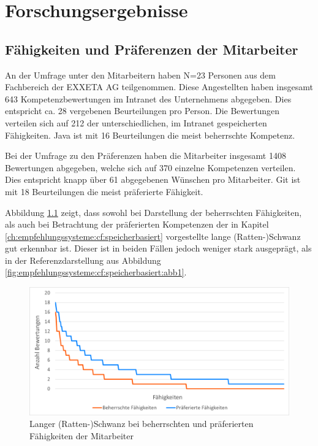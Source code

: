 \chapter{Forschungsergebnisse}
\label{ch:ergebnisse}

\section{Fähigkeiten und Präferenzen der Mitarbeiter}
\label{ch:ergebnisse:analyse}
An der Umfrage unter den Mitarbeitern haben N=23 Personen aus dem Fachbereich \JES der EXXETA AG teilgenommen. Diese Angestellten haben insgesamt 643 Kompetenzbewertungen im Intranet des Unternehmens abgegeben. Dies entspricht ca. 28 vergebenen Beurteilungen pro Person. Die Bewertungen verteilen sich auf 212 der \anzFaehigkeiten unterschiedlichen, im Intranet gespeicherten Fähigkeiten. Java ist mit 16 Beurteilungen die meist beherrschte Kompetenz.

Bei der Umfrage zu den Präferenzen haben die Mitarbeiter insgesamt 1408 Bewertungen abgegeben, welche sich auf 370 einzelne Kompetenzen verteilen. Dies entspricht knapp über 61 abgegebenen Wünschen pro Mitarbeiter. Git ist mit 18 Beurteilungen die meist präferierte Fähigkeit.

Abbildung \ref{fig:ergebnisse:analyse:abb1} zeigt, dass sowohl bei Darstellung der beherrschten Fähigkeiten, als auch bei Betrachtung der präferierten Kompetenzen der in Kapitel \ref{ch:empfehlungssysteme:cf:speicherbasiert} vorgestellte lange (Ratten-)Schwanz gut erkennbar ist. Dieser ist in beiden Fällen jedoch weniger stark ausgeprägt, als in der Referenzdarstellung aus Abbildung \ref{fig:empfehlungssysteme:cf:speicherbasiert:abb1}.

\begin{figure}[h]
	\centering
	\includegraphics[width=1\textwidth]{gfx/long-tail-insgesamt.png}
	\caption{Langer (Ratten-)Schwanz bei beherrschten und präferierten Fähigkeiten der Mitarbeiter}
	\label{fig:ergebnisse:analyse:abb1}
\end{figure}

